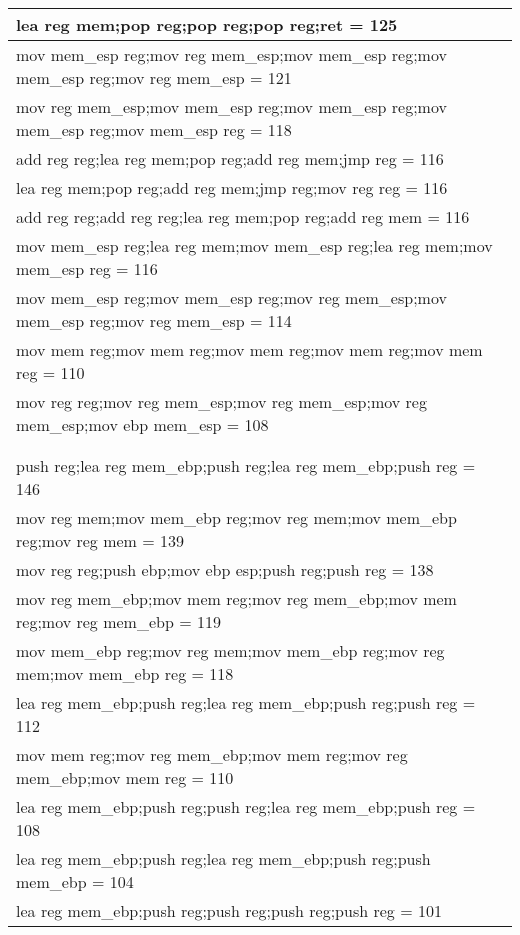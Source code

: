 \begin{table*}[h!]
\begin{center}
\begin{tabular}{ | l |}
lea reg mem;pop reg;pop reg;pop reg;ret   = 125\\  \hline 
mov mem\_esp reg;mov reg mem\_esp;mov mem\_esp reg;mov mem\_esp reg;mov reg mem\_esp = 121\\  \hline 
mov reg mem\_esp;mov mem\_esp reg;mov mem\_esp reg;mov mem\_esp reg;mov mem\_esp reg = 118\\  \hline 
add reg reg;lea reg mem;pop reg;add reg mem;jmp reg  = 116\\  \hline 
lea reg mem;pop reg;add reg mem;jmp reg;mov reg reg = 116\\  \hline 
add reg reg;add reg reg;lea reg mem;pop reg;add reg mem = 116\\  \hline 
mov mem\_esp reg;lea reg mem;mov mem\_esp reg;lea reg mem;mov mem\_esp reg = 116\\  \hline 
mov mem\_esp reg;mov mem\_esp reg;mov reg mem\_esp;mov mem\_esp reg;mov reg mem\_esp = 114\\  \hline 
mov mem reg;mov mem reg;mov mem reg;mov mem reg;mov mem reg = 110\\  \hline 
mov reg reg;mov reg mem\_esp;mov reg mem\_esp;mov reg mem\_esp;mov ebp mem\_esp = 108\\  \hline 
\\  \hline 
\\  \hline 
push reg;lea reg mem\_ebp;push reg;lea reg mem\_ebp;push reg  = 146\\  \hline 
mov reg mem;mov mem\_ebp reg;mov reg mem;mov mem\_ebp reg;mov reg mem = 139\\  \hline 
mov reg reg;push ebp;mov ebp esp;push reg;push reg  = 138\\  \hline 
mov reg mem\_ebp;mov mem reg;mov reg mem\_ebp;mov mem reg;mov reg mem\_ebp = 119\\  \hline 
mov mem\_ebp reg;mov reg mem;mov mem\_ebp reg;mov reg mem;mov mem\_ebp reg = 118\\  \hline 
lea reg mem\_ebp;push reg;lea reg mem\_ebp;push reg;push reg  = 112\\  \hline 
mov mem reg;mov reg mem\_ebp;mov mem reg;mov reg mem\_ebp;mov mem reg = 110\\  \hline 
lea reg mem\_ebp;push reg;push reg;lea reg mem\_ebp;push reg  = 108\\  \hline 
lea reg mem\_ebp;push reg;lea reg mem\_ebp;push reg;push mem\_ebp  = 104\\  \hline 
lea reg mem\_ebp;push reg;push reg;push reg;push reg  = 101
\end{tabular}
\end{center}
\end{table*}
